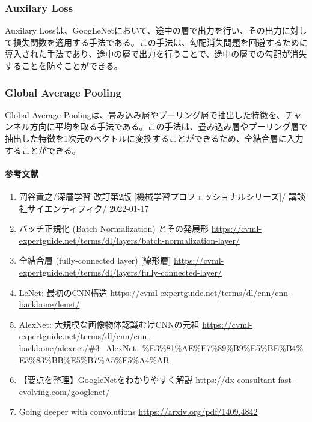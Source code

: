 \documentclass{ltjsarticle}
\begin{document}
\subsubsection{Auxilary Loss}
Auxilary Lossは、GoogLeNetにおいて、途中の層で出力を行い、その出力に対して損失関数を適用する手法である。この手法は、勾配消失問題を回避するために導入された手法であり、途中の層で出力を行うことで、途中の層での勾配が消失することを防ぐことができる。

\subsubsection{Global Average Pooling}
Global Average Poolingは、畳み込み層やプーリング層で抽出した特徴を、チャンネル方向に平均を取る手法である。この手法は、畳み込み層やプーリング層で抽出した特徴を1次元のベクトルに変換することができるため、全結合層に入力することができる。


\paragraph{参考文献}
\begin{enumerate}
  \item 岡谷貴之/深層学習 改訂第2版 [機械学習プロフェッショナルシリーズ]/ 講談社サイエンティフィク/ 2022-01-17
  \item バッチ正規化 (Batch Normalization) とその発展形 \url{https://cvml-expertguide.net/terms/dl/layers/batch-normalization-layer/}
  \item 全結合層 (fully-connected layer) [線形層] \url{https://cvml-expertguide.net/terms/dl/layers/fully-connected-layer/}
  \item LeNet: 最初のCNN構造 \url{https://cvml-expertguide.net/terms/dl/cnn/cnn-backbone/lenet/}
  \item AlexNet: 大規模な画像物体認識むけCNNの元祖 \url{https://cvml-expertguide.net/terms/dl/cnn/cnn-backbone/alexnet/#3_AlexNet_\%E3\%81\%AE\%E7\%89\%B9\%E5\%BE\%B4\%E3\%83\%BB\%E5\%B7\%A5\%E5\%A4\%AB}
  \item 【要点を整理】GoogleNetをわかりやすく解説 \url{https://dx-consultant-fast-evolving.com/googlenet/}
  \item Going deeper with convolutions \url{https://arxiv.org/pdf/1409.4842}
\end{enumerate}
\end{document}
